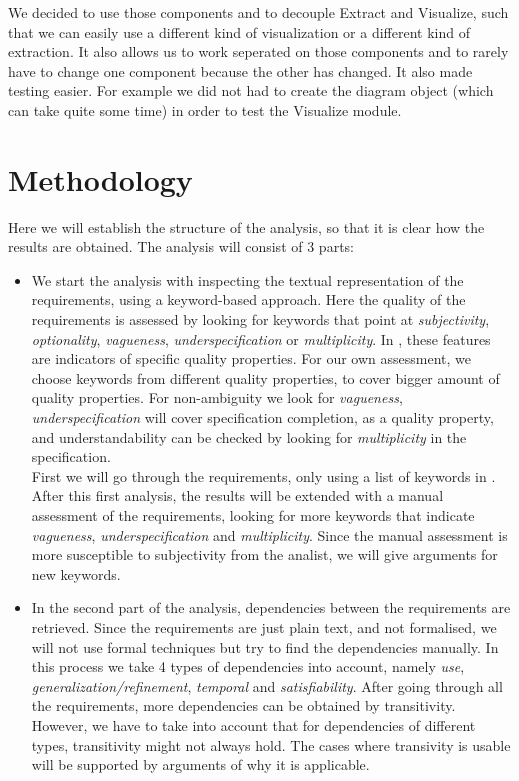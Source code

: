 \documentclass[a4paper,11pt]{article}
\begin{document}
	We decided to use those components and to decouple Extract and Visualize, such that we can easily use a different kind of visualization or a different kind of extraction.
	It also allows us to work seperated on those components and to rarely have to change one component because the other has changed.
	It also made testing easier. For example we did not had to create the diagram object (which can take quite some time) in order to test the Visualize module.
	
	
	\section{Methodology}
		Here we will establish the structure of the analysis, so that it is clear how the results are obtained. The analysis will consist of 3 parts:
		\begin{itemize}
			\item We start the analysis with inspecting the textual representation of the requirements, using a keyword-based approach. Here the quality of the requirements is assessed by looking for keywords that point at \textit{subjectivity}, \textit{optionality}, \textit{vagueness}, \textit{underspecification} or \textit{multiplicity}. In \cite{keywords}, these features are indicators of specific quality properties. For our own assessment, we choose keywords from different quality properties, to cover bigger amount of quality properties. For non-ambiguity we look for \textit{vagueness}, \textit{underspecification} will cover specification completion, as a quality property, and understandability can be checked by looking for \textit{multiplicity} in the specification. \\
			First we will go through the requirements, only using a list of keywords in \cite{keywords}. After this first analysis, the results will be extended with a manual assessment of the requirements, looking for more keywords that indicate \textit{vagueness}, \textit{underspecification} and \textit{multiplicity}. Since the manual assessment is more susceptible to subjectivity from the analist, we will give arguments for new keywords.
			\item In the second part of the analysis, dependencies between the requirements are retrieved. Since the requirements are just plain text, and not formalised, we will not use formal techniques but try to find the dependencies manually. In this process we take 4 types of dependencies into account, namely \textit{use}, \textit{generalization/refinement}, \textit{temporal} and \textit{satisfiability}. After going through all the requirements, more dependencies can be obtained by transitivity. However, we have to take into account that for dependencies of different types, transitivity might not always hold. The cases where transivity is usable will be supported by arguments of why it is applicable.

\end{itemize}
\end{document}

